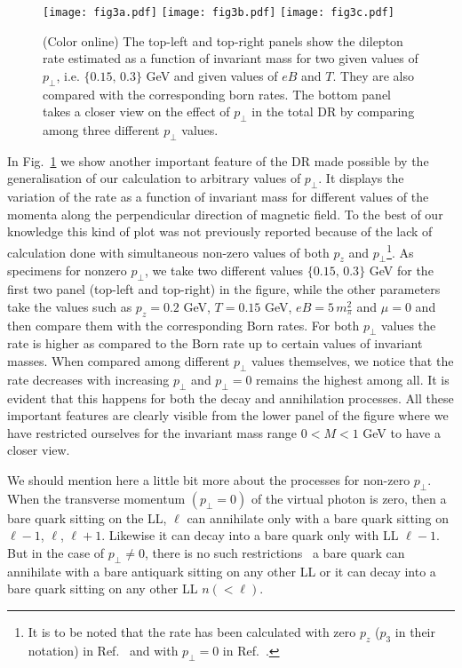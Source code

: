 \documentclass[aps,prd,floatfix,showpacs,showkeys,superscriptadress,unsortedaddress,nofootinbib,onecolumn]{revtex4-1}
\newcommand{\sperp}{\scriptscriptstyle{\perp}}
\begin{document}
\begin{figure}
\begin{center}
\texttt{[image: fig3a.pdf]} 
\texttt{[image: fig3b.pdf]}
\texttt{[image: fig3c.pdf]}
\caption{(Color online) The top-left and top-right panels show the dilepton rate estimated as a function of invariant mass for two given values of $p_{\sperp}$, i.e. $\{0.15,\,0.3\}$ GeV and given values of $eB$ and $T$. They are also compared with the corresponding born rates. The bottom panel takes a closer view on the effect of $p_{\sperp}$ in the total DR by comparing among three different $p_{\sperp}$ values.}
\label{fig:dr_diff_pT}
\end{center}
\end{figure}

In Fig.~\ref{fig:dr_diff_pT} we show another important feature of the DR made possible by the generalisation of our calculation to arbitrary values of $p_{\sperp}$. It displays the variation of the rate as a function of invariant mass for different values of the momenta along the perpendicular direction of magnetic field. To the best of our knowledge this kind of plot was not previously reported because of the lack of calculation done with simultaneous non-zero values of both $p_z$ and $p_{\sperp}$\footnote{It is to be noted that the rate has been calculated with zero $p_z$ ($p_3$ in their notation) in Ref.~\cite{Sadooghi:2016jyf} and with $p_{\sperp}=0$ in Ref.~\cite{Ghosh:2018xhh}.}. As specimens for nonzero $p_{\sperp}$, we take two different values $\{0.15,\,0.3\}$ GeV for the first two panel (top-left and top-right) in the figure, while the other parameters take the values such as $p_z=0.2$ GeV, $T=0.15$ GeV, $eB=5\, m_\pi^2$ and $\mu=0$ and then compare them with the corresponding Born rates. For both $p_{\sperp}$ values the rate is higher as compared to the Born rate up to certain values of invariant masses. When compared among different $p_{\sperp}$ values themselves, we notice that the rate decreases with increasing $p_{\sperp}$ and $p_{\sperp}=0$ remains the highest among all. It is evident that this happens for both the decay and annihilation processes. All these important features are clearly visible from the lower panel of the figure where we have restricted ourselves for the invariant mass range $0<M<1$ GeV to have a closer view.  

We should mention here a little bit more about the processes for non-zero $p_{\sperp}$. When the transverse momentum $(p_{\sperp}=0)$ of the virtual photon is zero, then a bare quark sitting on the LL, $\ell$ can annihilate only with a bare quark sitting on $\ell-1$, $\ell$, $\ell+1$. Likewise it can decay into a bare quark only with LL $\ell-1$. But in the case of $p_{\sperp}\neq 0$, there is no such restrictions \textemdash\, a bare quark can annihilate with a bare antiquark sitting on any other LL or it can decay into a bare quark sitting on any other LL $n(<\ell)$.
\end{document}
